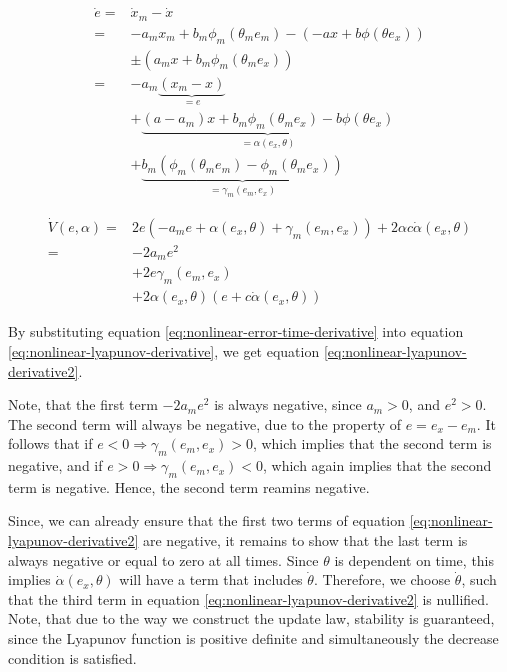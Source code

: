 \begin{equation}
    \begin{aligned}
    \dot e 
= & \dot x_m - \dot x \\ 
= & -a_mx_m + b_m\phi_m(\theta_me_m) - (-ax + b\phi(\theta e_x)) \\
    & \pm (a_mx + b_m \phi_m(\theta_m e_x)) \\
    = & -a_m \underbrace{(x_m-x)}_{=e} \\ 
    & + \underbrace{(a-a_m)x+b_m\phi_m(\theta_me_x) - b\phi(\theta e_x)}_{=\alpha(e_x, \theta)} \\ 
    & + \underbrace{b_m(\phi_m(\theta_m e_m)-\phi_m(\theta_m e_x))}_{=\gamma_m(e_m,e_x)}
    \end{aligned}
    \label{eq:nonlinear-error-time-derivative}
\end{equation}

\begin{equation}
    \begin{aligned}
    \dot V(e, \alpha) 
    = & 2e(-a_me + \alpha(e_x, \theta) + \gamma_m(e_m, e_x)) + 2\alpha c \dot \alpha(e_x, \theta)\\
    = & -2a_me^2 \\ 
    & + 2e\gamma_m(e_m, e_x) 
    \\ 
    & + 2\alpha(e_x, \theta)(e + c \dot \alpha(e_x, \theta))
    \end{aligned}
    \label{eq:nonlinear-lyapunov-derivative2}
\end{equation}

By substituting equation \eqref{eq:nonlinear-error-time-derivative} into equation \eqref{eq:nonlinear-lyapunov-derivative}, we get equation \eqref{eq:nonlinear-lyapunov-derivative2}. 

Note, that the first term $-2a_me^2$ is always negative, since $a_m>0$, and $e^2 > 0$. The second term will always be negative, due to the property of $e=e_x-e_m$. It follows that if $e<0 \Rightarrow \gamma_m(e_m, e_x)>0$, which implies that the second term is negative, and if $e>0 \Rightarrow \gamma_m(e_m, e_x)<0$, which again implies that the second term is negative. Hence, the second term reamins negative.

Since, we can already ensure that the first two terms of equation \eqref{eq:nonlinear-lyapunov-derivative2} are negative, it remains to show that the last term is always negative or equal to zero at all times. Since $\theta$ is dependent on time, this implies $\dot \alpha(e_x, \theta)$ will have a term that includes $\dot \theta$. Therefore, we choose  $\dot \theta$, such that the third term in equation \eqref{eq:nonlinear-lyapunov-derivative2} is nullified. Note, that due to the way we construct the update law, stability is guaranteed, since the Lyapunov function is positive definite and simultaneously the decrease condition is satisfied.

